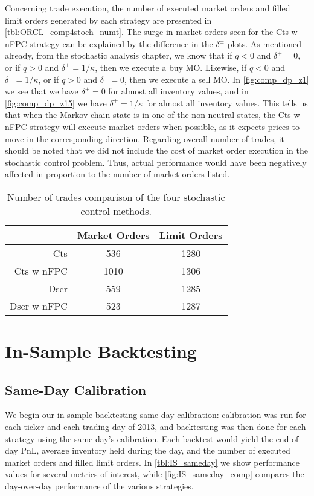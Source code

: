 Concerning trade execution, the number of executed market orders and filled limit orders generated by each strategy are presented in \autoref{tbl:ORCL_comp4stoch_numt}. The surge in market orders seen for the Cts w nFPC strategy can be explained by the difference in the $\delta^\pm$ plots. As mentioned already, from the stochastic analysis chapter, we know that if $q < 0 $ and $\delta^+ =0$, or if $q > 0$ and $\delta^+ = 1/\kappa$, then we execute a buy MO. Likewise, if $q < 0 $ and $\delta^- =1/\kappa$, or if $q > 0$ and $\delta^- = 0$, then we execute a sell MO. In \autoref{fig:comp_dp_z1} we see that we have $\delta^+ = 0$ for almost all inventory values, and in \autoref{fig:comp_dp_z15} we have  $\delta^+ = 1/\kappa$ for almost all inventory values. This tells us that when the Markov chain state is in one of the non-neutral states, the Cts w nFPC strategy will execute market orders when possible, as it expects prices to move in the corresponding direction. Regarding overall number of trades, it should be noted that we did not include the cost of market order execution in the stochastic control problem. Thus, actual performance would have been negatively affected in proportion to the number of market orders listed.
\begin{table}
\centering
{}
\begin{tabular}{@{} r *{2}{c} @{}}
\toprule
& Market Orders & Limit Orders \\
\midrule
Cts          &  536 & 1280 \\
Cts w nFPC   & 1010 & 1306 \\
Dscr         &  559 & 1285 \\
Dscr w nFPC  &  523 & 1287 \\
\bottomrule
\end{tabular}
\caption{Number of trades comparison of the four stochastic control methods.}
\label{tbl:ORCL_comp4stoch_numt}
\end{table}
\FloatBarrier
\section{In-Sample Backtesting}

\subsection{Same-Day Calibration}
We begin our in-sample backtesting same-day calibration: calibration was run for each ticker and each trading day of 2013, and backtesting was then done for each strategy using the same day's calibration. Each backtest would yield the end of day PnL, average inventory held during the day, and the number of executed market orders and filled limit orders. In \autoref{tbl:IS_sameday} we show performance values for several metrics of interest, while \autoref{fig:IS_sameday_comp} compares the day-over-day performance of the various strategies. 

